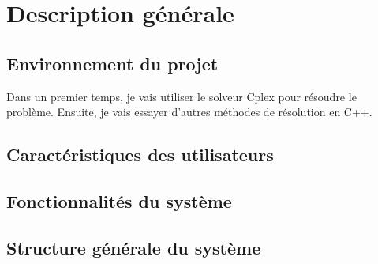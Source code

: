 \chapter{Description générale}

\section{Environnement du projet}
Dans un premier temps, je vais utiliser le solveur Cplex pour résoudre le problème.
Ensuite, je vais essayer d'autres méthodes de résolution en C++.
\section{Caractéristiques des utilisateurs}

\section{Fonctionnalités du système}

\section{Structure générale du système}